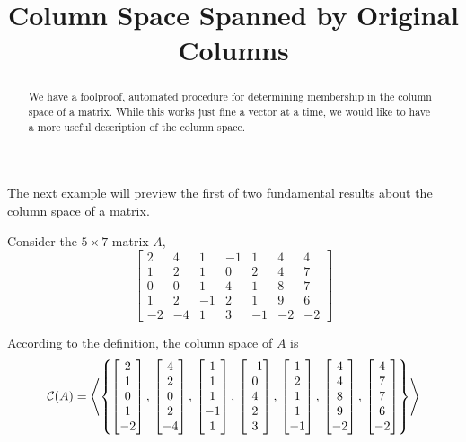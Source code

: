 \documentclass{ximera}
\title{Column Space Spanned by Original Columns}
\begin{document}
\begin{abstract}
  We have a foolproof, automated procedure for determining membership
  in the column space of a matrix.  While this works just fine a
  vector at a time, we would like to have a more useful description of
  the column space.
\end{abstract}
\maketitle

The next example will preview the first of two fundamental results
about the column space of a matrix.

\begin{example}

  Consider the $5\times 7$ matrix $A$,
  \[
    \begin{bmatrix}
      2 & 4 & 1 & -1 & 1 & 4 & 4 \\
      1 & 2 & 1 & 0 & 2 & 4 & 7 \\
      0 & 0 & 1 & 4 & 1 & 8 & 7 \\
      1 & 2 & -1 & 2 & 1 & 9 & 6 \\
      -2 & -4 & 1 & 3 & -1 & -2 & -2
    \end{bmatrix}
  \]
  
  According to the definition, the column space of $A$ is
  \[
    \mathcal{C}\!\left(A\right)=
    \left\langle\left\{
        \begin{bmatrix} 2 \\ 1 \\ 0 \\ 1 \\ -2 \end{bmatrix},\,
        \begin{bmatrix} 4 \\ 2 \\ 0 \\ 2 \\ -4 \end{bmatrix},\,
        \begin{bmatrix} 1 \\ 1 \\ 1 \\ -1 \\ 1 \end{bmatrix},\,
        \begin{bmatrix} -1 \\ 0 \\ 4 \\ 2 \\ 3 \end{bmatrix},\,
        \begin{bmatrix} 1 \\ 2 \\ 1 \\ 1 \\ -1 \end{bmatrix},\,
        \begin{bmatrix} 4 \\ 4 \\ 8 \\ 9 \\ -2 \end{bmatrix},\,
        \begin{bmatrix} 4 \\ 7 \\ 7 \\ 6 \\ -2 \end{bmatrix}
      \right\}\right\rangle
  \]


\end{example}
\end{document}
